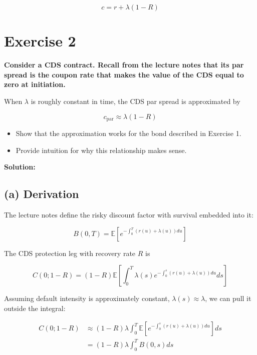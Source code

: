 \documentclass{article}
\begin{document}
\[
\boxed{c = r + \lambda(1 - R)}
\]


\newpage


\section{Exercise 2}

\textbf{Consider a CDS contract. Recall from the lecture notes that its par spread is the coupon rate that makes the value of the CDS equal to zero at initiation.}

When $\lambda$ is roughly constant in time, the CDS par spread is approximated by

\[
\boxed{c_{\mathrm{par}} \approx \lambda(1-R)}
\]

\begin{itemize}
    \item[(a)] Show that the approximation works for the bond described in Exercise 1.
    \item[(b)] Provide intuition for why this relationship makes sense.
\end{itemize}

\vspace{4pt}

\textbf{Solution:}

\subsection*{(a) Derivation}

The lecture notes define the risky discount factor with survival embedded into it:

\[
B(0,T)=\mathbb{E}\left[e^{-\int_0^T (r(u)+\lambda(u))du}\right]
\]

The CDS protection leg with recovery rate $R$ is

\[
C(0;1-R)
=
(1-R)
\mathbb{E}
\left[
\int_0^T
\lambda(s)
 e^{-\int_0^s (r(u)+\lambda(u))du}
 ds
\right]
\]

Assuming default intensity is approximately constant, $\lambda(s)\approx \lambda$, we can pull it outside the integral:

\begin{align*}
C(0;1-R)
&\approx
(1-R)\lambda
\int_0^T
\mathbb{E}
\left[
 e^{-\int_0^s (r(u)+\lambda(u))du}
\right] ds \\
&=
(1-R)\lambda
\int_0^T B(0,s)ds
\end{align*}
\end{document}
